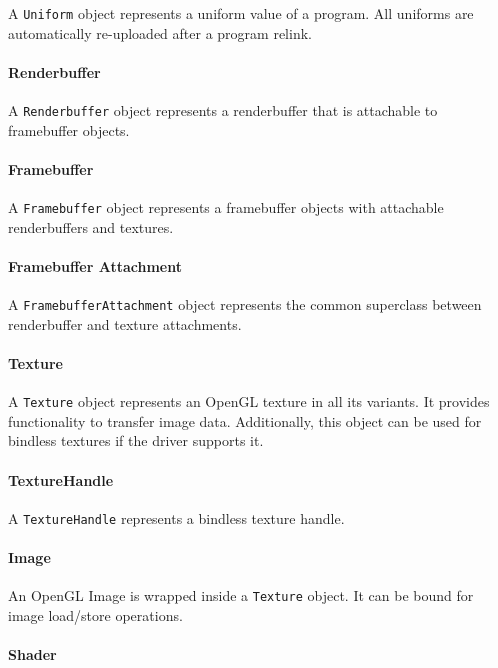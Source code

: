\documentclass{article}
\begin{document}
A \lstinline|Uniform| object represents a uniform value of a program. All uniforms are automatically re-uploaded after a program relink.

\paragraph{Renderbuffer}

A \lstinline|Renderbuffer| object represents a renderbuffer that is attachable to framebuffer objects.

\paragraph{Framebuffer}

A \lstinline|Framebuffer| object represents a framebuffer objects with attachable renderbuffers and textures.

\paragraph{Framebuffer Attachment}

A \lstinline|FramebufferAttachment| object represents the common superclass between renderbuffer and texture attachments.

\paragraph{Texture}

A \lstinline|Texture| object represents an OpenGL texture in all its variants. It provides functionality to transfer image data.
Additionally, this object can be used for bindless textures if the driver supports it.

\paragraph{TextureHandle}

A \lstinline|TextureHandle| represents a bindless texture handle.

\paragraph{Image}

An OpenGL Image is wrapped inside a \lstinline|Texture| object. It can be bound for image load/store operations.

\paragraph{Shader}
\end{document}
